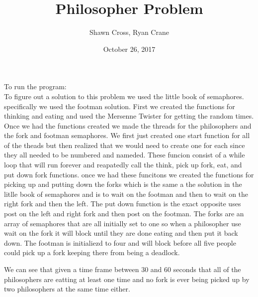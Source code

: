 \documentclass[letterpaper,10pt,titlepage]{article}
\begin{document}
\title{Philosopher Problem}
\date{October 26, 2017}
\author{Shawn Cross, Ryan Crane}
\maketitle

To run the program:\\

To figure out a solution to this problem we used the little book of semaphores. 
specifically we used the footman solution. First we created the functions for 
thinking and eating and used the Mersenne Twister for getting the random times. 
Once we had the functions created we made the threads for the philosophers and 
the fork and footman semaphores. We first just created one start function for 
all of the theads but then realized that we would need to create one for each 
since they all needed to be numbered and nameded. These funcion consist of a 
while loop that will run forever and reapatedly call the think, pick up fork, 
eat, and put down fork functions. once we had these funcitons we created the 
functions for picking up and putting down the forks which is the same a the 
solution in the litlle book of semaphores and is to wait on the footman and 
then to wait on the right fork and then the left. The put down function is 
the exact opposite uses post on the left and right fork and then post on the 
footman. The forks are an array of semaphores that are all initially set to 
one so when a philosopher use wait on the fork it will block until they are 
done eating and then put it back down. The footman is initialiezd to four and 
will block before all five people could pick up a fork keeping there from being 
a deadlock. 

We can see that given a time frame between 30 and 60 seconds that all of the 
philosophers are eatting at least one time and no fork is ever being picked 
up by two philosophers at the same time either. 
\end{document}
